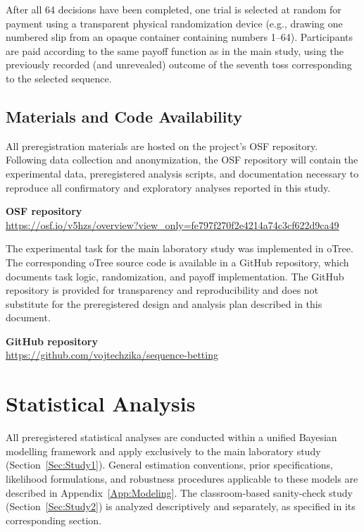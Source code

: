 \documentclass[11pt,a4paper]{article}
\numberwithin{equation}{section}
\begin{document}
After all 64 decisions have been completed, one trial is selected at random for payment using a transparent physical randomization device (e.g., drawing one numbered slip from an opaque container containing numbers 1--64). Participants are paid according to the same payoff function as in the main study, using the previously recorded (and unrevealed) outcome of the seventh toss corresponding to the selected sequence.




\subsection{Materials and Code Availability}
\label{Sec:Materials}
All preregistration materials are hosted on the project's OSF repository. Following data collection and anonymization, the OSF repository will contain the experimental data, preregistered analysis scripts, and documentation necessary to reproduce all confirmatory and exploratory analyses reported in this study.

\textbf{OSF repository}\\
 \url{https://osf.io/v5hzs/overview?view_only=fe797f270f2e4214a74c3cf622d9ca49}  



The experimental task for the main laboratory study was implemented in oTree. The corresponding oTree source code is available in a GitHub repository, which documents task logic, randomization, and payoff implementation. The GitHub repository is provided for transparency and reproducibility and does not substitute for the preregistered design and analysis plan described in this document.

\textbf{GitHub repository}\\
\url{https://github.com/vojtechzika/sequence-betting}
	

\section{Statistical Analysis}
\label{Sec:StatisticalAnalysis}

All preregistered statistical analyses are conducted within a unified Bayesian modelling framework and apply exclusively to the main laboratory study (Section~\ref{Sec:Study1}). General estimation conventions, prior specifications, likelihood formulations, and robustness procedures applicable to these models are described in Appendix~\ref{App:Modeling}. The classroom-based sanity-check study (Section~\ref{Sec:Study2}) is analyzed descriptively and separately, as specified in its corresponding section.
\end{document}
